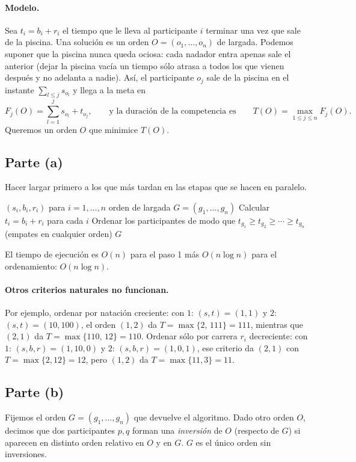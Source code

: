 \paragraph{Modelo.} Sea $t_i=b_i+r_i$ el tiempo que le lleva al participante $i$ terminar
una vez que sale de la piscina. Una solución es un orden $O=(o_1,\dots,o_n)$ de largada. Podemos
suponer que la piscina nunca queda ociosa: cada nadador entra apenas sale el anterior (dejar la
piscina vacía un tiempo sólo atrasa a todos los que vienen después y no adelanta a nadie). Así,
el participante $o_j$ sale de la piscina en el instante $\sum_{l\le j}s_{o_l}$ y llega a la
meta en
\[
F_j(O)=\sum_{l=1}^{j} s_{o_l}+t_{o_j},
\qquad\text{y la duración de la competencia es}\qquad
T(O)=\max_{1\le j\le n} F_j(O).
\]
Queremos un orden $O$ que minimice $T(O)$.

\subsection*{Parte (a)}
Hacer largar primero a los que más tardan en las etapas que se hacen en paralelo.

\begin{algorithm}[H]
\caption{Orden de largada del triatlón}
\begin{algorithmic}[1]
\Require $(s_i,b_i,r_i)$ para $i=1,\dots,n$
\Ensure orden de largada $G=(g_1,\dots,g_n)$
\State Calcular $t_i=b_i+r_i$ para cada $i$
\State Ordenar los participantes de modo que $t_{g_1}\ge t_{g_2}\ge\cdots\ge t_{g_n}$ (empates en cualquier orden)
\State \Return $G$
\end{algorithmic}
\end{algorithm}
El tiempo de ejecución es $O(n)$ para el paso 1 más $O(n\log n)$ para el ordenamiento:
$O(n\log n)$.

\paragraph{Otros criterios naturales no funcionan.} Por ejemplo, ordenar por natación
creciente: con $1$: $(s,t)=(1,1)$ y $2$: $(s,t)=(10,100)$, el orden $(1,2)$ da
$T=\max\{2,\,111\}=111$, mientras que $(2,1)$ da $T=\max\{110,\,12\}=110$. Ordenar sólo por
carrera $r_i$ decreciente: con $1$: $(s,b,r)=(1,10,0)$ y $2$: $(s,b,r)=(1,0,1)$, ese criterio
da $(2,1)$ con $T=\max\{2,12\}=12$, pero $(1,2)$ da $T=\max\{11,3\}=11$.

\subsection*{Parte (b)}
Fijemos el orden $G=(g_1,\dots,g_n)$ que devuelve el algoritmo. Dado otro orden $O$, decimos que
dos participantes $p,q$ forman una \emph{inversión} de $O$ (respecto de $G$) si aparecen en
distinto orden relativo en $O$ y en $G$. $G$ es el único orden sin inversiones.

